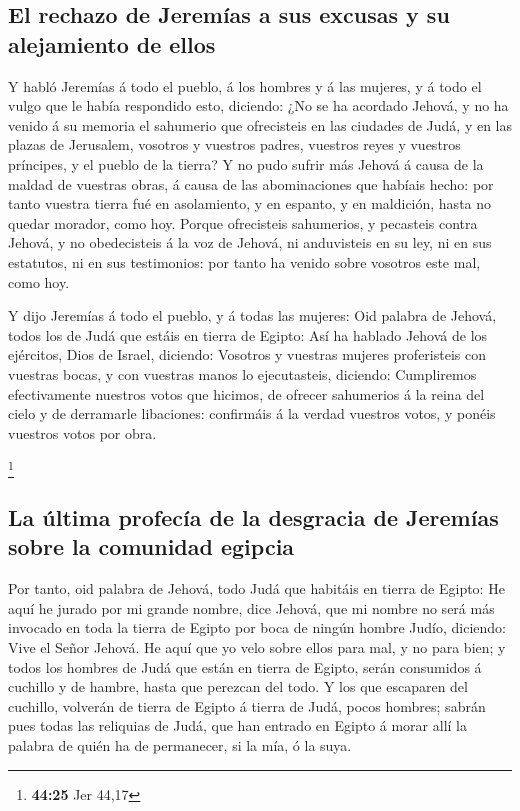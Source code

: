 \hypertarget{el-rechazo-de-jeremuxedas-a-sus-excusas-y-su-alejamiento-de-ellos}{%
\subsection{El rechazo de Jeremías a sus excusas y su alejamiento de
ellos}\label{el-rechazo-de-jeremuxedas-a-sus-excusas-y-su-alejamiento-de-ellos}}

 Y habló Jeremías á todo el pueblo, á los hombres y á las
mujeres, y á todo el vulgo que le había respondido esto, diciendo:
 ¿No se ha acordado Jehová, y no ha venido á su memoria
el sahumerio que ofrecisteis en las ciudades de Judá, y en las plazas de
Jerusalem, vosotros y vuestros padres, vuestros reyes y vuestros
príncipes, y el pueblo de la tierra?  Y no pudo sufrir
más Jehová á causa de la maldad de vuestras obras, á causa de las
abominaciones que habíais hecho: por tanto vuestra tierra fué en
asolamiento, y en espanto, y en maldición, hasta no quedar morador, como
hoy.  Porque ofrecisteis sahumerios, y pecasteis contra
Jehová, y no obedecisteis á la voz de Jehová, ni anduvisteis en su ley,
ni en sus estatutos, ni en sus testimonios: por tanto ha venido sobre
vosotros este mal, como hoy.

 Y dijo Jeremías á todo el pueblo, y á todas las mujeres:
Oid palabra de Jehová, todos los de Judá que estáis en tierra de Egipto:
 Así ha hablado Jehová de los ejércitos, Dios de Israel,
diciendo: Vosotros y vuestras mujeres proferisteis con vuestras bocas, y
con vuestras manos lo ejecutasteis, diciendo: Cumpliremos efectivamente
nuestros votos que hicimos, de ofrecer sahumerios á la reina del cielo y
de derramarle libaciones: confirmáis á la verdad vuestros votos, y
ponéis vuestros votos por obra.

\footnote{\textbf{44:25} Jer 44,17}

\hypertarget{la-uxfaltima-profecuxeda-de-la-desgracia-de-jeremuxedas-sobre-la-comunidad-egipcia}{%
\subsection{La última profecía de la desgracia de Jeremías sobre la
comunidad
egipcia}\label{la-uxfaltima-profecuxeda-de-la-desgracia-de-jeremuxedas-sobre-la-comunidad-egipcia}}

 Por tanto, oid palabra de Jehová, todo Judá que habitáis
en tierra de Egipto: He aquí he jurado por mi grande nombre, dice
Jehová, que mi nombre no será más invocado en toda la tierra de Egipto
por boca de ningún hombre Judío, diciendo: Vive el Señor Jehová.
 He aquí que yo velo sobre ellos para mal, y no para
bien; y todos los hombres de Judá que están en tierra de Egipto, serán
consumidos á cuchillo y de hambre, hasta que perezcan del todo.
 Y los que escaparen del cuchillo, volverán de tierra de
Egipto á tierra de Judá, pocos hombres; sabrán pues todas las reliquias
de Judá, que han entrado en Egipto á morar allí la palabra de quién ha
de permanecer, si la mía, ó la suya.

